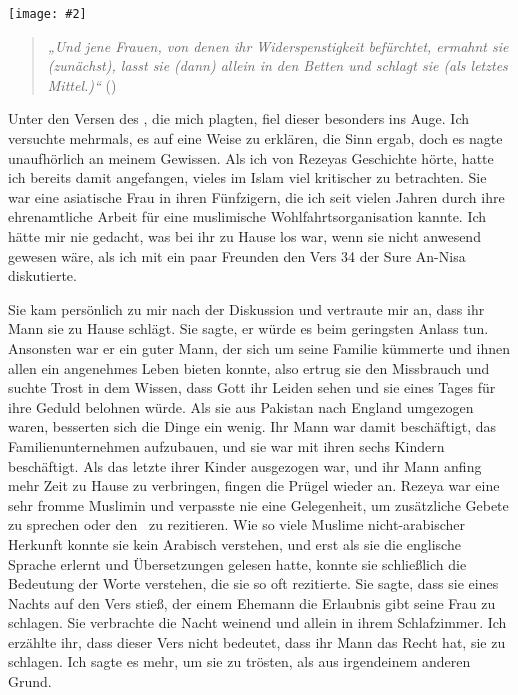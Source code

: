 \documentclass[12pt]{memoir}
\newcommand{\img}[3]{\begin{center}%
\texttt{[image: \#2]}\\{\small\em#3}%
\end{center}}
\begin{document}
\img{scale=0.6}{Man_Reading_Koran.jpg}{}

\begin{quote}
\emph{„Und jene Frauen, von denen ihr Widerspenstigkeit befürchtet,
ermahnt sie (zunächst), lasst sie (dann) allein in den Betten
und schlagt sie (als letztes Mittel.)“}
()
\end{quote}

Unter den Versen des \Quran, die mich plagten,
fiel dieser besonders ins Auge.
Ich versuchte mehrmals, es auf eine Weise zu erklären, die Sinn ergab,
doch es nagte unaufhörlich an meinem Gewissen.
Als ich von Rezeyas Geschichte hörte,
hatte ich bereits damit angefangen,
vieles im Islam viel kritischer zu betrachten.
Sie war eine asiatische Frau in ihren Fünfzigern,
die ich seit vielen Jahren durch ihre ehrenamtliche Arbeit
für eine muslimische Wohlfahrtsorganisation kannte.
Ich hätte mir nie gedacht, was bei ihr zu Hause los war,
wenn sie nicht anwesend gewesen wäre,
als ich mit ein paar Freunden den Vers 34 der Sure An-Nisa diskutierte.

Sie kam persönlich zu mir nach der Diskussion und vertraute mir an,
dass ihr Mann sie zu Hause schlägt.
Sie sagte, er würde es beim geringsten Anlass tun.
Ansonsten war er ein guter Mann,
der sich um seine Familie kümmerte
und ihnen allen ein angenehmes Leben bieten konnte,
also ertrug sie den Missbrauch und suchte Trost in dem Wissen,
dass Gott ihr Leiden sehen
und sie eines Tages für ihre Geduld belohnen würde.
Als sie aus Pakistan nach England umgezogen waren,
besserten sich die Dinge ein wenig.
Ihr Mann war damit beschäftigt, das Familienunternehmen aufzubauen,
und sie war mit ihren sechs Kindern beschäftigt.
Als das letzte ihrer Kinder ausgezogen war,
und ihr Mann anfing mehr Zeit zu Hause zu verbringen,
fingen die Prügel wieder an.
Rezeya war eine sehr fromme Muslimin und verpasste nie eine Gelegenheit,
um zusätzliche Gebete zu sprechen oder den \Quran\ zu rezitieren.
Wie so viele Muslime nicht-arabischer Herkunft
konnte sie kein Arabisch verstehen,
und erst als sie die englische Sprache erlernt
und Übersetzungen gelesen hatte,
konnte sie schließlich die Bedeutung der Worte verstehen,
die sie so oft rezitierte.
Sie sagte, dass sie eines Nachts auf den Vers stieß,
der einem Ehemann die Erlaubnis gibt seine Frau zu schlagen.
Sie verbrachte die Nacht weinend und allein in ihrem Schlafzimmer.
Ich erzählte ihr, dass dieser Vers nicht bedeutet,
dass ihr Mann das Recht hat, sie zu schlagen.
Ich sagte es mehr, um sie zu trösten, als aus irgendeinem anderen Grund.
\end{document}

